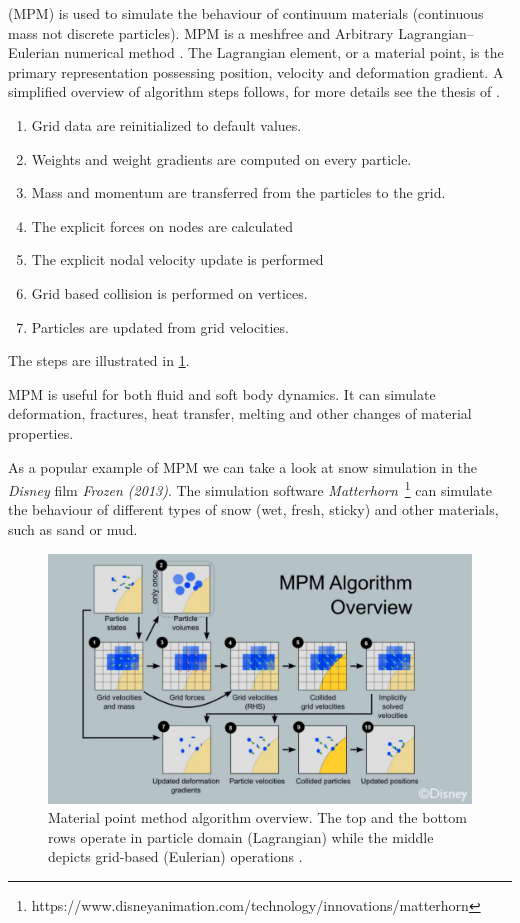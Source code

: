  (MPM) is used to simulate the behaviour of continuum materials (continuous mass not discrete particles). MPM is a meshfree and Arbitrary Lagrangian–Eulerian numerical method \cite{ALE}. The Lagrangian element, or a material point, is the primary representation possessing position, velocity and deformation gradient. A simplified overview of algorithm steps follows, for more details see the thesis of \citet{jiang2015material}.

\begin{enumerate}
    \item Grid data are reinitialized to default values.
    \item Weights and weight gradients are computed on every particle.
    \item Mass and momentum are transferred from the particles to the grid.
    \item The explicit forces on nodes are calculated
    \item The explicit nodal velocity update is performed
    \item Grid based collision is performed on vertices.
    \item Particles are updated from grid velocities.
\end{enumerate}
The steps are illustrated in \cref{fig:mpm}.

MPM is useful for both fluid and soft body dynamics. It can simulate deformation, fractures, heat transfer, melting and other changes of material properties. 

As a popular example of MPM we can take a look at snow simulation in the \emph{Disney} film \emph{Frozen (2013)}. The simulation software \emph{Matterhorn}~\footnote{https://www.disneyanimation.com/technology/innovations/matterhorn} can simulate the behaviour of different types of snow (\eg wet, fresh, sticky) and other materials, such as sand or mud.

\begin{figure}
\centering
\includegraphics[width=\textwidth]{img/MPM}
\caption{Material point method algorithm overview. The top and the bottom rows operate in particle domain (Lagrangian) while the middle depicts grid-based (Eulerian) operations \cite{disney}.
}
\label{fig:mpm}
\end{figure}


